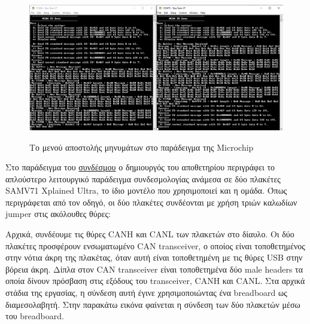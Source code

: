 \documentclass[a4paper,nobib,justified]{tufte-book}
\begin{document}
\begin{figure}[ht]
	\includegraphics[width=0.8\linewidth]{media/images/microchip-example-menu.png}
	\label{fig:microchip-example-menu}
	\caption[Το μενού αποστολής μηνυμάτων στο παράδειγμα της Microchip]{Το μενού αποστολής μηνυμάτων στο παράδειγμα της Microchip}
\end{figure}

\par Στο παράδειγμα του \href{https://github.com/Microchip-MPLAB-Harmony/csp_apps_sam_e70_s70_v70_v71/tree/master/apps/mcan/mcan_fd_operation_interrupt_timestamp}{συνδέσμου} ο δημιουργός του αποθετηρίου περιγράφει το απλούστερο λειτουργικό παράδειγμα συνδεσμολογίας ανάμεσα σε δύο πλακέτες SAMV71 Xplained Ultra, το ίδιο μοντέλο που χρησιμοποιεί και η ομάδα. Όπως περιγράφεται από τον οδηγό, οι δύο πλακέτες συνδέονται με χρήση τριών καλωδίων jumper στις ακόλουθες θύρες:

\par Αρχικά, συνδέουμε τις θύρες CANH και CANL των πλακετών στο δίαυλο. Οι δύο πλακέτες προσφέρουν ενσωματωμένο CAN transceiver, ο οποίος είναι τοποθετημένος στην νότια άκρη της πλακέτας, όταν αυτή είναι τοποθετημένη με τις θύρες USB στην βόρεια άκρη. Δίπλα στον CAN transceiver είναι τοποθετημένα δύο male headers τα οποία δίνουν πρόσβαση στις εξόδους του transceiver, CANH και CANL. Στα αρχικά στάδια της εργασίας, η σύνδεση αυτή έγινε χρησιμοποιώντας ένα breadboard ως διαμεσολαβητή. Στην παρακάτω εικόνα φαίνεται η σύνδεση των δύο πλακετών μέσω του breadboard.
\end{document}
